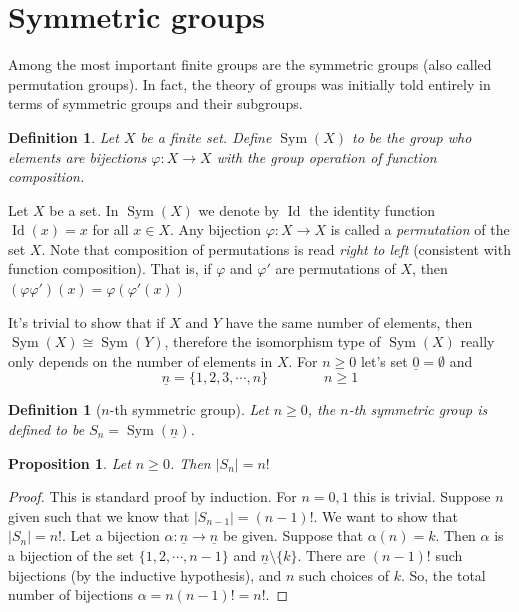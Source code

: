 \documentclass[12pt]{article}
\numberwithin{equation}{subsection}
\newtheorem{prop}[subsection]{Proposition}
\newtheorem{defn}[subsection]{Definition}
\theoremstyle{note}
\newcommand{\Sym}{\operatorname{Sym}}
\newcommand{\Id}{\operatorname{Id}}
\begin{document}
\section{Symmetric groups}

Among the most important finite groups are the symmetric groups (also called permutation groups). In fact, the theory of groups was initially told entirely in terms of symmetric groups and their subgroups.



\begin{defn}
Let $X$ be a finite set. Define $\Sym(X)$ to be the group who elements are bijections $\varphi\colon X\to X$ with the group operation of function composition.
\end{defn}

Let $X$ be a set. In $\Sym(X)$ we denote by $\Id$ the identity function $\Id(x)=x$ for all $x\in X$. Any bijection $\varphi\colon X\to X$ is called a \textit{permutation} of the set $X$. Note that composition of permutations is read \textit{right to left} (consistent with function composition). That is, if $\varphi$ and $\varphi'$ are permutations of $X$, then $(\varphi\varphi')(x)=\varphi(\varphi'(x))$

It's trivial to show that if $X$ and $Y$ have the same number of elements, then $\Sym(X)\cong \Sym(Y)$, therefore the isomorphism type of $\Sym(X)$ really only depends on the number of elements in $X$. For $n\geq 0$ let's set $\underline{0}=\emptyset$ and \begin{equation} \underline{n}=\{1,2,3,\cdots,n\} \qquad \qquad n\geq 1\end{equation}

\begin{defn}[$n$-th symmetric group]
	Let $n\geq 0$, the $n$-th symmetric group is defined to be $S_n=\Sym(\underline{n})$. 
\end{defn}

\begin{prop}
	Let $n\geq 0$. Then $|S_n|=n!$
\end{prop}

\begin{proof}
	This is standard proof by induction. For $n=0,1$ this is trivial. Suppose $n$ given such that we know that $|S_{n-1}|=(n-1)!$. We want to show that $|S_n|=n!$. Let a bijection $\alpha\colon \underline{n}\to \underline{n}$ be given. Suppose that $\alpha(n)=k$. Then $\alpha$ is a bijection of the set $\{1,2,\cdots,n-1\}$ and $\underline{n}\setminus \{k\}$. There are $(n-1)!$ such bijections (by the inductive hypothesis), and $n$ such choices of $k$. So, the total number of bijections $\alpha=n(n-1)!=n!$.
\end{proof}
\end{document}
